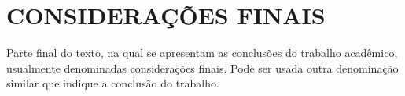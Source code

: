 \chapter{CONSIDERAÇÕES FINAIS}
Parte final do texto, na qual se apresentam as conclusões do trabalho acadêmico, usualmente denominadas considerações finais.  Pode ser usada outra denominação similar que indique a conclusão do trabalho.

